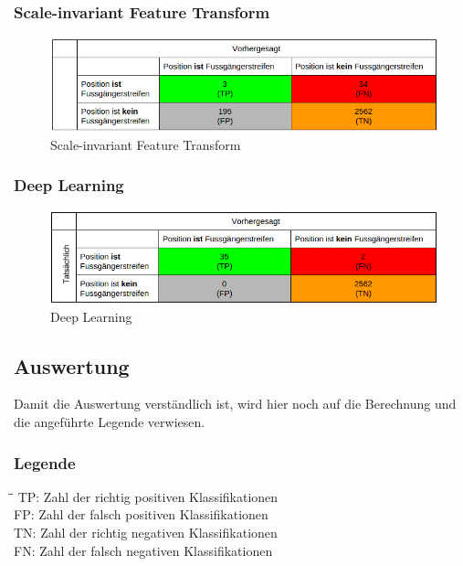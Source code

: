 \subsubsection{Scale-invariant Feature Transform}	
\begin{figure}[H]
\includegraphics[width=\textwidth]{images/sif_conf.png}
\caption[Scale-invariant Feature Transform]{Scale-invariant Feature Transform}
\end{figure}
\subsubsection{Deep Learning}	
\begin{figure}[H]
\includegraphics[width=\textwidth]{images/deep_conf.png}
\caption[Deep Learning]{Deep Learning}
\end{figure}
\subsection{Auswertung}
Damit die Auswertung verständlich ist, wird hier noch auf die Berechnung und die angeführte Legende verwiesen.
\subsubsection{Legende}
\begin{tabbing}
    \hspace*{3cm}\=\hspace*{6cm}\= \kill
    TP:	\> Zahl der richtig positiven Klassifikationen\\
	FP:	\> Zahl der falsch positiven Klassifikationen\\
	TN:	\> Zahl der richtig negativen Klassifikationen\\
	FN:	\> Zahl der falsch negativen Klassifikationen\\
\end{tabbing}

